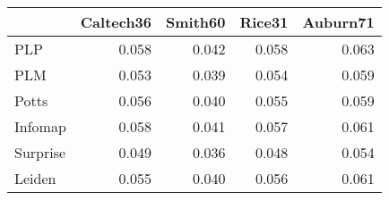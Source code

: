 \begin{tabular}{lrrrr}
\toprule
{} & Caltech36 & Smith60 & Rice31 & Auburn71 \\
\midrule
PLP      &     0.058 &   0.042 &  0.058 &    0.063 \\
PLM      &     0.053 &   0.039 &  0.054 &    0.059 \\
Potts    &     0.056 &   0.040 &  0.055 &    0.059 \\
Infomap  &     0.058 &   0.041 &  0.057 &    0.061 \\
Surprise &     0.049 &   0.036 &  0.048 &    0.054 \\
Leiden   &     0.055 &   0.040 &  0.056 &    0.061 \\
\bottomrule
\end{tabular}
